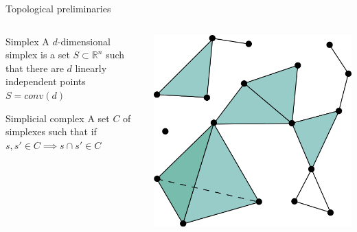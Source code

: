 \documentclass[unknownkeysallowed]{beamer}
\begin{document}
\begin{frame}{Topological preliminaries}

	\begin{columns}[T]
	\begin{column}{0.5\linewidth}

	\begin{block}{Simplex}
	A $d$-dimensional simplex is a set $S \subset \mathbb{R}^n$ such that there are $d$ linearly independent points $S = conv(d)$ 

	\end{block}

	\begin{block}{Simplicial complex}
	A set $C$ of simplexes such that if $s, s' \in C \implies s \cap s' \in C$ 
	\end{block}
	\end{column}
	\begin{column}{0.5\linewidth}
	\includegraphics[width=\textwidth,height=0.5\textheight,right]{Simplicial_complex_example.svg.png}

	\end{column}
	\end{columns}
\end{frame}
\end{document}
